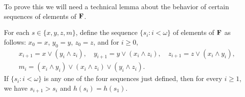 To prove this we will need a technical lemma about the behavior of 
certain sequences of elements of $\mathbf{F}$.

\begin{lemma}\label{claim:2.3}
For each $s \in \{x, y, z, m\}$, define the sequence $\{s_i : i < \omega\}$
of elements of $\mathbf{F}$ as follows: 
$x_0 = x$, $y_0 = y$, $z_0 = z$, and for $i\geqslant 0$, 
\begin{gather*}
  x_{i+1} = x\vee (y_i \wedge z_i), \quad  y_{i+1} = y\vee (x_i \wedge z_i), \quad  z_{i+1} = z\vee (x_i \wedge y_i),\\
  m_i = (x_i \wedge y_i) \vee (x_i \wedge z_i) \vee (y_i \wedge z_i).
\end{gather*}
  If $\{s_i : i< \omega\}$ is any one of the four sequences just defined, then for every $i\geq 1$, 
  we have $s_{i+1} > s_i$ and $h(s_{i}) = h(s_1)$.
\end{lemma}

